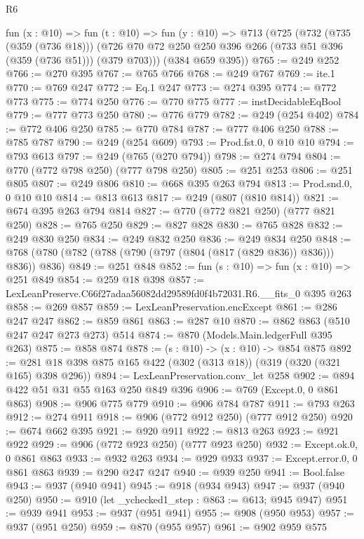 \begin{lexlean}{R6}
\begin{coremodule}
  fun (x : @10) =>
  fun (t : @10) =>
  fun (y : @10) =>
  @713
    (@725
      (@732
        (@735 (@359 (@736 @18)))
        (@726 @70 @72 @250 @250 @396 @266 (@733 @51 @396 (@359 (@736 @51))) (@379 @703)))
      (@384 @659 @395))
@765 := @249 @252
@766 := @270 @395
@767 := @765 @766
@768 := @249 @767
@769 := ite.{1}
@770 := @769 @247
@772 := Eq.{1} @247
@773 := @274 @395
@774 := @772 @773
@775 := @774 @250
@776 := @770 @775
@777 := instDecidableEqBool
@779 := @777 @773 @250
@780 := @776 @779
@782 := @249 (@254 @402)
@784 := @772 @406 @250
@785 := @770 @784
@787 := @777 @406 @250
@788 := @785 @787
@790 := @249 (@254 @609)
@793 := Prod.fst.{0, 0} @10 @10
@794 := @793 @613
@797 := @249 (@765 (@270 @794))
@798 := @274 @794
@804 := @770 (@772 @798 @250) (@777 @798 @250)
@805 := @251 @253
@806 := @251 @805
@807 := @249 @806
@810 := @668 @395 @263 @794
@813 := Prod.snd.{0, 0} @10 @10
@814 := @813 @613
@817 := @249 (@807 (@810 @814))
@821 := @674 @395 @263 @794 @814
@827 := @770 (@772 @821 @250) (@777 @821 @250)
@828 := @765 @250
@829 := @827 @828
@830 := @765 @828
@832 := @249 @830 @250
@834 := @249 @832 @250
@836 := @249 @834 @250
@848 := @768 (@780 (@782 (@788 (@790 (@797 (@804 (@817 (@829 @836)) @836))) @836)) @836)
@849 := @251 @848
@852 := fun (s : @10) => fun (x : @10) => @251 @849
@854 := @259 @18 @398
@857 := LexLeanPreserve.C66f27adaa56082dd29589fd0f4b72031.R6.__fits_0 @395 @263
@858 := @269 @857
@859 := LexLeanPreservation.encExcept
@861 := @286 @247 @247
@862 := @859 @861
@863 := @287 @10
@870 := @862 @863 (@510 @247 @247 @273 @273) @514
@874 := @870 (Models.Main.ledgerFull @395 @263)
@875 := @858 @874
@878 := (s : @10) -> (x : @10) -> @854 @875
@892 := @281 @18 @398 @875 @165 @422 (@302 (@313 @18)) (@319 (@320 (@321 @165) @398 @296))
@894 := LexLeanPreservation.conv_let @258
@902 := @894 @422 @51 @31 @55 @163 @250 @849 @396
@906 := @769 (Except.{0, 0} @861 @863)
@908 := @906 @775 @779
@910 := @906 @784 @787
@911 := @793 @263
@912 := @274 @911
@918 := @906 (@772 @912 @250) (@777 @912 @250)
@920 := @674 @662 @395
@921 := @920 @911
@922 := @813 @263
@923 := @921 @922
@929 := @906 (@772 @923 @250) (@777 @923 @250)
@932 := Except.ok.{0, 0} @861 @863
@933 := @932 @263
@934 := @929 @933
@937 := Except.error.{0, 0} @861 @863
@939 := @290 @247 @247
@940 := @939 @250
@941 := Bool.false
@943 := @937 (@940 @941)
@945 := @918 (@934 @943)
@947 := @937 (@940 @250)
@950 := @910 (let _ychecked1_step : @863 := @613; @945 @947)
@951 := @939 @941
@953 := @937 (@951 @941)
@955 := @908 (@950 @953)
@957 := @937 (@951 @250)
@959 := @870 (@955 @957)
@961 := @902 @959 @575

\end{coremodule}
\end{lexlean}
